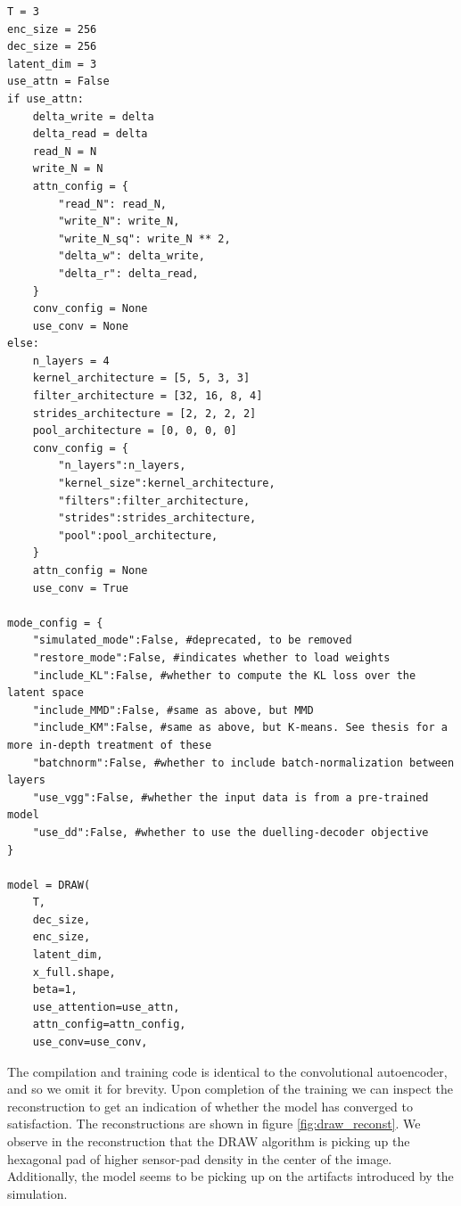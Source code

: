 \begin{lstlisting}[language=iPython]
T = 3
enc_size = 256
dec_size = 256
latent_dim = 3
use_attn = False
if use_attn:
    delta_write = delta
    delta_read = delta
    read_N = N
    write_N = N
    attn_config = {
        "read_N": read_N,
        "write_N": write_N,
        "write_N_sq": write_N ** 2,
        "delta_w": delta_write,
        "delta_r": delta_read,
    }
    conv_config = None
    use_conv = None
else:
    n_layers = 4
    kernel_architecture = [5, 5, 3, 3]
    filter_architecture = [32, 16, 8, 4]
    strides_architecture = [2, 2, 2, 2]
    pool_architecture = [0, 0, 0, 0]
    conv_config = {
        "n_layers":n_layers,
        "kernel_size":kernel_architecture,
        "filters":filter_architecture,
        "strides":strides_architecture,
        "pool":pool_architecture,
    }
    attn_config = None
    use_conv = True
    
mode_config = {
    "simulated_mode":False, #deprecated, to be removed
    "restore_mode":False, #indicates whether to load weights 
    "include_KL":False, #whether to compute the KL loss over the latent space
    "include_MMD":False, #same as above, but MMD 
    "include_KM":False, #same as above, but K-means. See thesis for a more in-depth treatment of these
    "batchnorm":False, #whether to include batch-normalization between layers
    "use_vgg":False, #whether the input data is from a pre-trained model 
    "use_dd":False, #whether to use the duelling-decoder objective 
}

model = DRAW(
    T,
    dec_size,
    enc_size,
    latent_dim,
    x_full.shape,
    beta=1,
    use_attention=use_attn,
    attn_config=attn_config,
    use_conv=use_conv,

\end{lstlisting}

\noindent The compilation and training code is identical to the convolutional autoencoder, and so we omit it for brevity. Upon completion of the training we can inspect the reconstruction to get an indication of whether the model has converged to satisfaction. The reconstructions are shown in figure \ref{fig:draw_reconst}. We observe in the reconstruction that the DRAW algorithm is picking up the hexagonal pad of higher sensor-pad density in the center of the image. Additionally, the model seems to be picking  up on the artifacts introduced by the simulation.

